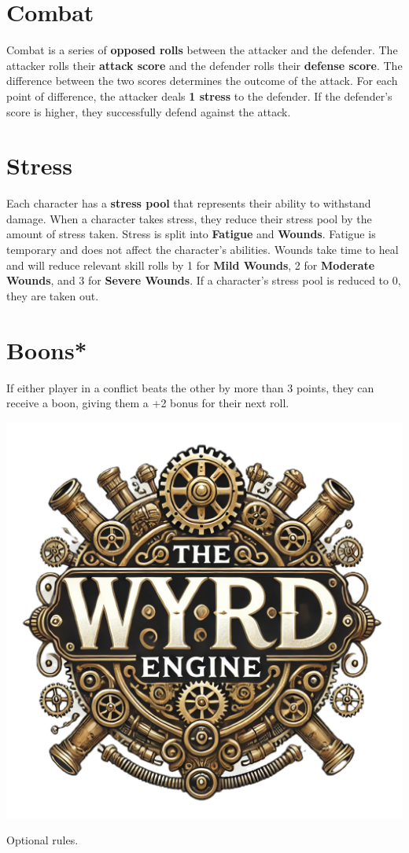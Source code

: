 \documentclass[nodeprecatedcode,bg=print]{dndbook}
\begin{document}
\begin{paracol}{2}
    \switchcolumn

    \section*{Combat}
    Combat is a series of \textbf{opposed rolls} between the attacker and the defender. The attacker rolls their \textbf{attack score} and the defender rolls their \textbf{defense score}. The difference between the two scores determines the outcome of the attack. For each point of difference, the attacker deals \textbf{1 stress} to the defender. If the defender's score is higher, they successfully defend against the attack.

    \section*{Stress}
    Each character has a \textbf{stress pool} that represents their ability to withstand damage. When a character takes stress, they reduce their stress pool by the amount of stress taken. Stress is split into \textbf{Fatigue} and \textbf{Wounds}. Fatigue is temporary and does not affect the character's abilities. Wounds take time to heal and will reduce relevant skill rolls by 1 for \textbf{Mild Wounds}, 2 for \textbf{Moderate Wounds}, and 3 for \textbf{Severe Wounds}. If a character's stress pool is reduced to 0, they are taken out.

    \DamageBox[]

    \section*{Boons*}
    If either player in a conflict beats the other by more than 3 points, they can receive a boon, giving them a +2 bonus for their next roll.

\end{paracol}

\vspace*{\fill}
\begin{center}
    \includegraphics[width=.2\textwidth]{img/wyrd-logo}
\end{center}

{\small * Optional rules.}
\end{document}
